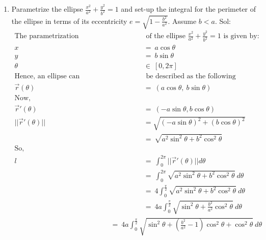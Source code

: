 \documentclass[14pt]{extarticle}
\begin{document}
\begin{enumerate}
    \item Parametrize the ellipse $\frac{x^2}{a^2}+\frac{y^2}{b^2} = 1$ and set-up the integral for the perimeter of the ellipse in terms of its eccentricity $e = \sqrt{1-\frac{b^2}{a^2}}$. Assume $b < a$.
    \newline \hfill \newline
    Sol:
    \begin{align*}
        \text{The parametrization} & \text{ of the ellipse } \frac{x^2}{a^2}+\frac{y^2}{b^2} = 1 \text{ is given by:} \\
        x \ &= \ a\cos{\theta} \\
        y \ &= \ b\sin{\theta} \\
        \theta \ &\in \ [0, 2\pi] \\
        \text{Hence, an ellipse can}& \text{ be described as the following function:} \\
        \vec{r}(\theta) \ &= \ (a\cos{\theta}, \ b\sin{\theta}) \\
        \text{Now, } \text{ } \text{ } \text{ } \text{ } \text{ } \text{ } \text{ } \text{ } \text{ }\text{ }\text{ }\text{ }\text{ }\text{ }\text{ }\text{ }\text{ }\text{ }\text{ }\text{ }\\
        \vec{r}'(\theta) \ &= \ (-a\sin{\theta}, b\cos{\theta}) \\
        ||\vec{r}'(\theta)|| &= \sqrt{(-a\sin{\theta})^2 + (b\cos{\theta})^2} \\
        &= \ \sqrt{a^2\sin^2{\theta}+b^2\cos^2{\theta}} \\
        \text{So,} \text{ }\text{ }\text{ }\text{ }\text{ }\text{ }\text{ }\text{ }\text{ }\text{ }\text{ }\text{ }\text{ }\text{ }\text{ }\text{ }\text{ }\text{ }\text{ }\text{ }\text{ }\text{ }\text{ }\text{ }\\
        l \ &= \ \int_{0}^{2\pi} ||\vec{r}'(\theta)|| d\theta \\
        &= \ \int_{0}^{2\pi} \sqrt{a^2\sin^2{\theta}+b^2\cos^2{\theta}} \ d\theta \\
        &= \ 4\int_{0}^{\frac{\pi}{2}} \sqrt{a^2\sin^2{\theta}+b^2\cos^2{\theta}} \ d\theta \\
        &= \ 4a\int_{0}^{\frac{\pi}{2}} \sqrt{\sin^2{\theta}+\frac{b^2}{a^2}\cos^2{\theta}} \ d\theta
    \end{align*}
    \begin{align*}
        \text{ }\text{ }\text{ }\text{ }\text{ }\text{ }\text{ }\text{ }\text{ }\text{ }\text{ }\text{ }\text{ }\text{ }\text{ }\text{ }\text{ }\text{ }\text{ }&= \ 4a\int_{0}^{\frac{\pi}{2}} \sqrt{\sin^2{\theta}+\left ( \frac{b^2}{a^2} - 1 \right )\cos^2{\theta} + \cos^2{\theta}} \ d\theta \\

\end{align*}
\end{enumerate}
\end{document}
